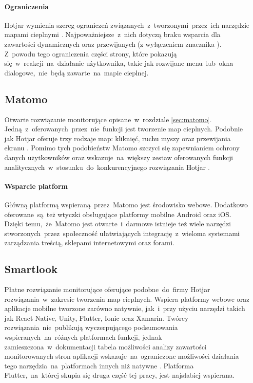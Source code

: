 \paragraph{Ograniczenia} 
Hotjar wymienia szereg ograniczeń związanych~z~tworzonymi~przez~ich narzędzie mapami cieplnymi \cite{Hotjar_limitations}. Najpoważniejsze~z~nich dotyczą braku wsparcia dla zawartości dynamicznych oraz przewijanych (z wyłączeniem znacznika ). Z~powodu tego ograniczenia części strony, które pokazują się~w~reakcji~na~działanie użytkownika, takie jak rozwijane menu~lub~okna dialogowe,~nie~będą zawarte~na~mapie cieplnej.

\subsection{Matomo}
\label{sec:matomo_heatmap}
Otwarte rozwiązanie monitorujące opisane~w~rozdziale \ref{sec:matomo}. Jedną~z~oferowanych~przez~nie~funkcji jest tworzenie map cieplnych. Podobnie jak Hotjar oferuje trzy rodzaje map: kliknięć, ruchu myszy oraz przewijania ekranu \cite{Matomo_heatmaps}. Pomimo tych podobieństw Matomo szczyci się zapewnianiem ochrony danych użytkowników oraz wskazuje~na~większy zestaw oferowanych funkcji analitycznych~w~stosunku~do~konkurencyjnego rozwiązania Hotjar \cite{Matomo_hotjar}.

\paragraph{Wsparcie platform} 
Główną platformą wspieraną~przez~Matomo jest środowisko webowe. Dodatkowo oferowane~są~też wtyczki obsługujące platformy mobilne Android oraz iOS. Dzięki temu,~że~Matomo jest otwarte~i~darmowe istnieje też wiele narzędzi stworzonych~przez~społeczność ułatwiających integrację~z~wieloma systemami zarządzania treścią, sklepami internetowymi oraz forami.

\subsection{Smartlook}
\label{sec:smartlook}
Płatne rozwiązanie monitorujące oferujące podobne~do~firmy Hotjar rozwiązania~w~zakresie tworzenia map cieplnych. Wspiera platformy webowe oraz aplikacje mobilne tworzone zarówno natywnie, jak~i~przy użyciu narzędzi takich jak React Native, Unity, Flutter, Ionic oraz Xamarin. Twórcy rozwiązania~nie~publikują wyczerpującego podsumowania wspieranych~na~różnych platformach funkcji, jednak zamieszczona~w~dokumentacji tabela możliwości analizy zawartości monitorowanych stron aplikacji wskazuje~na~ograniczone możliwości działania tego narzędzia~na~platformach innych niż natywne \cite{Smartlook_support}. Platforma Flutter,~na~której skupia się druga część tej pracy, jest najsłabiej wspierana.

